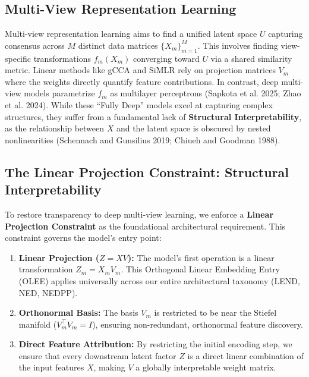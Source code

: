\documentclass[
  letterpaper,
]{report}
\providecommand{\tightlist}{%
  \setlength{\itemsep}{0pt}\setlength{\parskip}{0pt}}
\begin{document}
\subsection{Multi-View Representation
Learning}\label{multi-view-representation-learning}

Multi-view representation learning aims to find a unified latent space
\(U\) capturing consensus across \(M\) distinct data matrices
\(\{X_m\}_{m=1}^M\). This involves finding view-specific transformations
\(f_m(X_m)\) converging toward \(U\) via a shared similarity metric.
Linear methods like gCCA and SiMLR rely on projection matrices \(V_m\)
where the weights directly quantify feature contributions. In contrast,
deep multi-view models parametrize \(f_m\) as multilayer perceptrons
(Sapkota et al. 2025; Zhao et al. 2024). While these ``Fully Deep''
models excel at capturing complex structures, they suffer from a
fundamental lack of \textbf{Structural Interpretability}, as the
relationship between \(X\) and the latent space is obscured by nested
nonlinearities (Schennach and Gunsilius 2019; Chiueh and Goodman 1988).

\subsection{The Linear Projection Constraint: Structural
Interpretability}\label{the-linear-projection-constraint-structural-interpretability}

To restore transparency to deep multi-view learning, we enforce a
\textbf{Linear Projection Constraint} as the foundational architectural
requirement. This constraint governs the model's entry point:

\begin{enumerate}
\def\labelenumi{\arabic{enumi}.}
\tightlist
\item
  \textbf{Linear Projection (\(Z = XV\)):} The model's first operation
  is a linear transformation \(Z_m = X_m V_m\). This Orthogonal Linear
  Embedding Entry (OLEE) applies universally across our entire
  architectural taxonomy (LEND, NED, NEDPP).
\item
  \textbf{Orthonormal Basis:} The basis \(V_m\) is restricted to be near
  the Stiefel manifold (\(V_m^\top V_m = I\)), ensuring non-redundant,
  orthonormal feature discovery.
\item
  \textbf{Direct Feature Attribution:} By restricting the initial
  encoding step, we ensure that every downstream latent factor \(Z\) is
  a direct linear combination of the input features \(X\), making \(V\)
  a globally interpretable weight matrix.
\end{enumerate}
\end{document}
